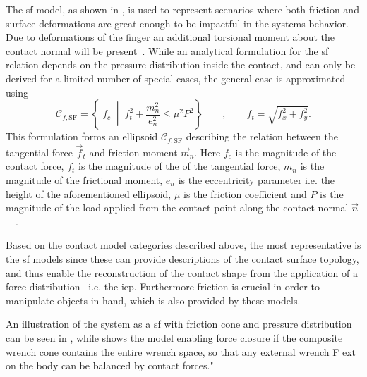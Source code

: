 The \gls{sf} model, as shown in , is used to represent scenarios where both friction and surface deformations are great enough to be impactful in the systems behavior. Due to deformations of the finger an additional torsional moment about the contact normal will be present~\cite[Chapter 38]{handbook-of-robotics}. While an analytical formulation for the \gls{sf} relation depends on the pressure distribution inside the contact, and
can only be derived for a limited number of special cases, the general case is approximated using 
%
\begin{equation} 
	\mathcal{C}_{f,\text{SF}} = \left\{ \; f_c \; \middle| \; f_t^2 + \frac{m_n^2}{e_n^2} \le \mu^2 P^2 \right\} \qquad , \qquad f_t = \sqrt{f_x^2 + f_y^2}.
	\label{eq:sf}
\end{equation}
This formulation forms an ellipsoid $\mathcal{C}_{f,\text{SF}}$ describing the relation between the tangential force $\vec{f}_t$ and friction moment $\vec{m}_n$. Here $f_c$ is the magnitude of the contact force, $f_t$ is the magnitude of the of the tangential force, $m_n$ is the magnitude of the frictional moment, $e_n$ is the eccentricity parameter i.e. the height of the aforementioned ellipsoid, $\mu$ is the friction coefficient and $P$ is the magnitude of the load applied from the contact point along the contact normal $\vec{n}$~\cite{practical-force-motion-models-for-sliding-manipulation}~\cite{soft-finger-model-with-adaptive-contact-geometry-for-grasping-and-manipulation-tasks}. \medskip

Based on the contact model categories described above, the most representative is the \gls{sf} models since these can provide descriptions of the contact surface topology, and thus enable the reconstruction of the contact shape from the application of a force distribution~\cite{contact-mechanics} i.e. the \gls{iep}. Furthermore friction is crucial in order to manipulate objects in-hand, which is also provided by these models.



 An illustration of the system as a \gls{sf} with friction cone and pressure distribution can be seen in , while  shows the model enabling force closure if the composite wrench cone contains the entire wrench space, so that any external wrench F ext on the body can be balanced by contact forces."~\cite{modern-robotics-mechanics-planning-and-control}

